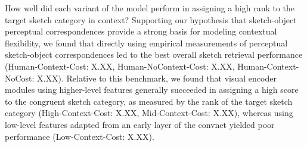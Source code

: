 \documentclass[9pt,twocolumn,twoside]{pnas-new}
\newcommand{\mwu}[1]{{\color{green}{[mwu: #1]}}}
\begin{document}


How well did each variant of the model perform in assigning a high rank to the target sketch category in context? Supporting our hypothesis that sketch-object perceptual correspondences provide a strong basis for modeling contextual flexibility, we found that directly using empirical measurements of perceptual sketch-object correspondences led to the best overall sketch retrieval performance (Human-Context-Cost: X.XX, Human-NoContext-Cost: X.XX, Human-Context-NoCost: X.XX). Relative to this benchmark, we found that visual encoder modules using higher-level features generally succeeded in assigning a high score to the congruent sketch category, as measured by the rank of the target sketch category (High-Context-Cost: X.XX, Mid-Context-Cost: X.XX), whereas using low-level features adapted from an early layer of the convnet yielded poor performance (Low-Context-Cost: X.XX).

\end{document}
